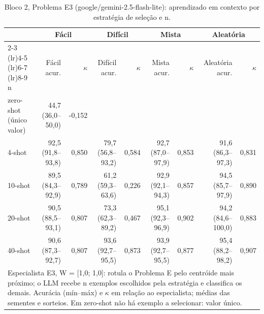 \begin{table}[htbp]
\centering
\small
\caption{Bloco 2, Problema E3 (google/gemini-2.5-flash-lite): aprendizado em contexto por estratégia de seleção e n.}
\label{tab:bloco2_E3_faseE_estrategia_x_nshot_flashlite}
\begin{tabular}{lrrrrrrrr}
\toprule
 & \multicolumn{2}{c}{Fácil} & \multicolumn{2}{c}{Difícil} & \multicolumn{2}{c}{Mista} & \multicolumn{2}{c}{Aleatória} \\ \cmidrule(lr){2-3} \cmidrule(lr){4-5} \cmidrule(lr){6-7} \cmidrule(lr){8-9}
n & Fácil acur. & $\kappa$ & Difícil acur. & $\kappa$ & Mista acur. & $\kappa$ & Aleatória acur. & $\kappa$ \\
\midrule
zero-shot (único valor) & 44,7 (36,0–50,0) & -0,152 &  &  &  &  &  &  \\
4-shot & 92,5 (91,8–93,8) & 0,850 & 79,7 (56,8–93,2) & 0,584 & 92,7 (87,0–97,9) & 0,853 & 91,6 (86,3–97,3) & 0,831 \\
10-shot & 89,5 (84,3–92,9) & 0,789 & 61,2 (59,3–63,6) & 0,226 & 92,9 (92,1–94,3) & 0,857 & 94,5 (85,7–97,9) & 0,890 \\
20-shot & 90,5 (88,5–93,1) & 0,807 & 73,3 (62,3–89,2) & 0,467 & 95,1 (92,3–96,9) & 0,902 & 94,2 (84,6–100,0) & 0,883 \\
40-shot & 90,6 (87,3–92,7) & 0,807 & 93,6 (92,7–95,5) & 0,873 & 93,9 (92,7–95,5) & 0,877 & 95,4 (88,2–98,2) & 0,907 \\
\bottomrule
\multicolumn{9}{p{0.95\linewidth}}{\footnotesize Especialista E3, W = [1,0; 1,0]: rotula o Problema E pelo centróide mais próximo; o LLM recebe n exemplos escolhidos pela estratégia e classifica os demais. Acurácia (mín–máx) e $\kappa$ em relação ao especialista; médias das sementes e sorteios. Em zero-shot não há exemplo a selecionar: valor único.} \\
\end{tabular}
\end{table}
